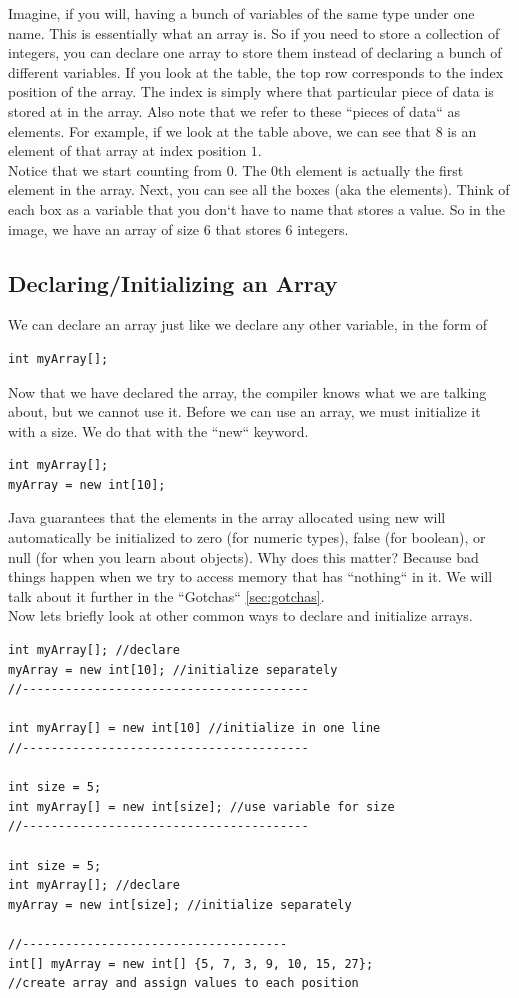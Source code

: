 \documentclass[11]{article}
\begin{document}
Imagine, if you will, having a bunch of variables of the same type under one name. This is essentially what an array is. So if you need to store a collection of integers, you can declare one array to store them instead of declaring a bunch of different variables. If you look at the table, the top row corresponds to the index position of the array. The index is simply where that particular piece of data is stored at in the array. Also note that we refer to these ``pieces of data`` as elements. For example, if we look at the table above, we can see that $8$ is an element of that array at index position $1$. \\

Notice that we start counting from $0$. The $0$th element is actually the first element in the array. Next, you can see all the boxes (aka the elements). Think of each box as a variable that you don`t have to name that stores a value. So in the image, we have an array of size $6$ that stores $6$ integers.\\

\subsection{Declaring/Initializing an Array}
We can declare an array just like we declare any other variable, in the form of
\begin{lstlisting}
int myArray[];
\end{lstlisting}
Now that we have declared the array, the compiler knows what we are talking about, but we cannot use it. Before we can use an array, we must initialize it with a size. We do that with the ``new`` keyword.

\begin{lstlisting}
int myArray[];
myArray = new int[10];
\end{lstlisting}
Java guarantees that the elements in the array allocated using new will automatically be initialized to zero (for numeric types), false (for boolean), or null (for when you learn about objects). Why does this matter? Because bad things happen when we try to access memory that has ``nothing`` in it. We will talk about it further in the ``Gotchas``  \autoref{sec:gotchas}. \\

Now lets briefly look at other common ways to declare and initialize arrays.

\begin{lstlisting}
int myArray[]; //declare
myArray = new int[10]; //initialize separately
//----------------------------------------

int myArray[] = new int[10] //initialize in one line
//----------------------------------------

int size = 5;
int myArray[] = new int[size]; //use variable for size
//----------------------------------------

int size = 5;
int myArray[]; //declare
myArray = new int[size]; //initialize separately

//-------------------------------------
int[] myArray = new int[] {5, 7, 3, 9, 10, 15, 27};
//create array and assign values to each position
\end{lstlisting}
\end{document}
